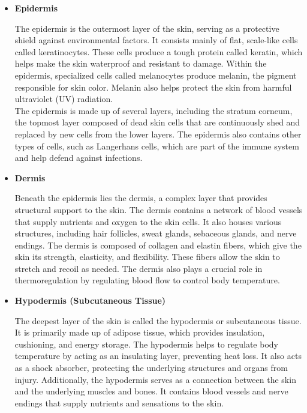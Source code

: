 \begin{itemize} \item \textbf{Epidermis}

      The epidermis is the outermost layer of the skin, serving as a protective
      shield against environmental factors. It consists mainly of flat,
      scale-like cells called keratinocytes. These cells produce a tough
      protein called keratin, which helps make the skin waterproof and
      resistant to damage. Within the epidermis, specialized cells called
      melanocytes produce melanin, the pigment responsible for skin color.
      Melanin also helps protect the skin from harmful ultraviolet (UV)
      radiation. \\

      The epidermis is made up of several layers, including the stratum
      corneum, the topmost layer composed of dead skin cells that are
      continuously shed and replaced by new cells from the lower layers. The
      epidermis also contains other types of cells, such as Langerhans cells,
      which are part of the immune system and help defend against infections.

      \newpage

    \item \textbf{Dermis}

      Beneath the epidermis lies the dermis, a complex layer that provides
      structural support to the skin. The dermis contains a network of blood
      vessels that supply nutrients and oxygen to the skin cells. It also
      houses various structures, including hair follicles, sweat glands,
      sebaceous glands, and nerve endings. The dermis is composed of collagen
      and elastin fibers, which give the skin its strength, elasticity, and
      flexibility. These fibers allow the skin to stretch and recoil as needed.
      The dermis also plays a crucial role in thermoregulation by regulating
      blood flow to control body temperature.

    \item \textbf{Hypodermis (Subcutaneous Tissue)}

      The deepest layer of the skin is called the hypodermis or subcutaneous
      tissue. It is primarily made up of adipose tissue, which provides
      insulation, cushioning, and energy storage. The hypodermis helps to
      regulate body temperature by acting as an insulating layer, preventing
      heat loss. It also acts as a shock absorber, protecting the underlying
      structures and organs from injury. Additionally, the hypodermis serves as
      a connection between the skin and the underlying muscles and bones. It
      contains blood vessels and nerve endings that supply nutrients and
      sensations to the skin.

\end{itemize}

